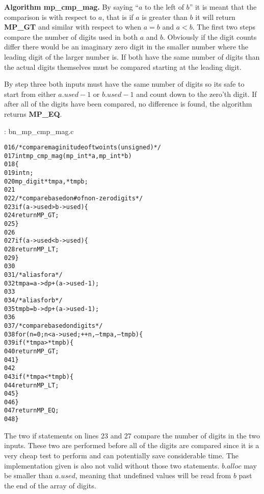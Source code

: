 \documentclass[b5paper]{book}
\begin{document}
\textbf{Algorithm mp\_cmp\_mag.}
By saying ``$a$ to the left of $b$'' it is meant that the comparison is with respect to $a$, that is if $a$ is greater than $b$ it will return
\textbf{MP\_GT} and similar with respect to when $a = b$ and $a < b$.  The first two steps compare the number of digits used in both $a$ and $b$.  
Obviously if the digit counts differ there would be an imaginary zero digit in the smaller number where the leading digit of the larger number is.  
If both have the same number of digits than the actual digits themselves must be compared starting at the leading digit.  

By step three both inputs must have the same number of digits so its safe to start from either $a.used - 1$ or $b.used - 1$ and count down to
the zero'th digit.  If after all of the digits have been compared, no difference is found, the algorithm returns \textbf{MP\_EQ}.

\vspace{+3mm}\begin{small}
\hspace{-5.1mm}{\bf File}: bn\_mp\_cmp\_mag.c
\vspace{-3mm}
\begin{alltt}
016   /* compare maginitude of two ints (unsigned) */
017   int mp_cmp_mag (mp_int * a, mp_int * b)
018   \{
019     int     n;
020     mp_digit *tmpa, *tmpb;
021   
022     /* compare based on # of non-zero digits */
023     if (a->used > b->used) \{
024       return MP_GT;
025     \}
026     
027     if (a->used < b->used) \{
028       return MP_LT;
029     \}
030   
031     /* alias for a */
032     tmpa = a->dp + (a->used - 1);
033   
034     /* alias for b */
035     tmpb = b->dp + (a->used - 1);
036   
037     /* compare based on digits  */
038     for (n = 0; n < a->used; ++n, --tmpa, --tmpb) \{
039       if (*tmpa > *tmpb) \{
040         return MP_GT;
041       \}
042   
043       if (*tmpa < *tmpb) \{
044         return MP_LT;
045       \}
046     \}
047     return MP_EQ;
048   \}
\end{alltt}
\end{small}

The two if statements on lines 23 and 27 compare the number of digits in the two inputs.  These two are performed before all of the digits
are compared since it is a very cheap test to perform and can potentially save considerable time.  The implementation given is also not valid 
without those two statements.  $b.alloc$ may be smaller than $a.used$, meaning that undefined values will be read from $b$ past the end of the 
array of digits.
\end{document}
